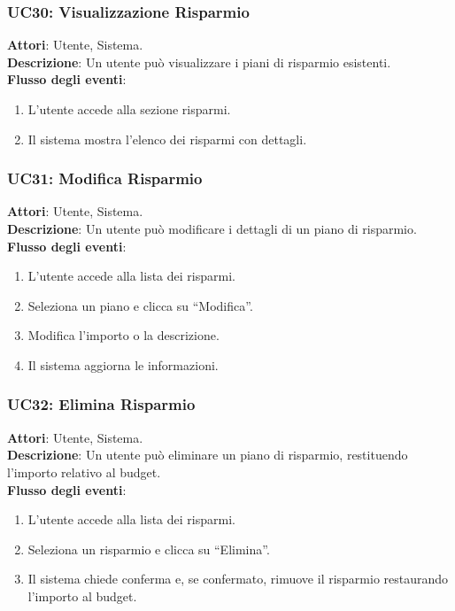 \subsubsection{UC30: Visualizzazione Risparmio}
\textbf{Attori}: Utente, Sistema. \\
\textbf{Descrizione}: Un utente può visualizzare i piani di risparmio esistenti. \\
\textbf{Flusso degli eventi}:
\begin{enumerate}
    \item L’utente accede alla sezione risparmi.
    \item Il sistema mostra l’elenco dei risparmi con dettagli.
\end{enumerate}

\subsubsection{UC31: Modifica Risparmio}
\textbf{Attori}: Utente, Sistema. \\
\textbf{Descrizione}: Un utente può modificare i dettagli di un piano di risparmio. \\
\textbf{Flusso degli eventi}:
\begin{enumerate}
    \item L’utente accede alla lista dei risparmi.
    \item Seleziona un piano e clicca su ``Modifica''.
    \item Modifica l’importo o la descrizione.
    \item Il sistema aggiorna le informazioni.
\end{enumerate}

\subsubsection{UC32: Elimina Risparmio}
\textbf{Attori}: Utente, Sistema. \\
\textbf{Descrizione}: Un utente può eliminare un piano di risparmio, restituendo l’importo relativo al budget. \\
\textbf{Flusso degli eventi}:
\begin{enumerate}
    \item L’utente accede alla lista dei risparmi.
    \item Seleziona un risparmio e clicca su ``Elimina''.
    \item Il sistema chiede conferma e, se confermato, rimuove il risparmio restaurando l’importo al budget.
\end{enumerate}
